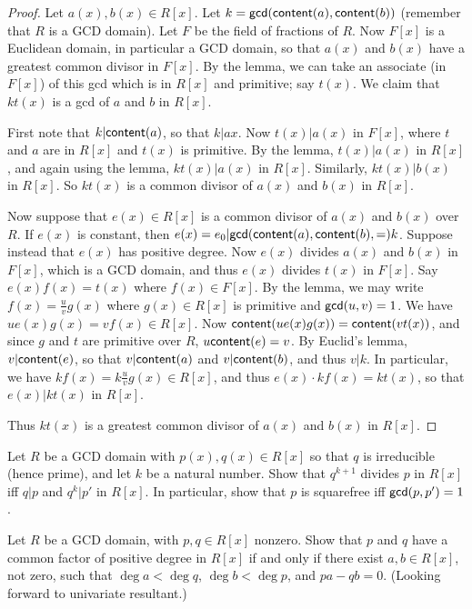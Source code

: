 \begin{proof}
Let \(a(x), b(x) \in R[x]\). Let \(k = \mathsf{gcd}(\mathsf{content}(a), \mathsf{content}(b))\) (remember that \(R\) is a GCD domain). Let \(F\) be the field of fractions of \(R\). Now \(F[x]\) is a Euclidean domain, in particular a GCD domain, so that \(a(x)\) and \(b(x)\) have a greatest common divisor in \(F[x]\). By the lemma, we can take an associate (in \(F[x]\)) of this gcd which is in \(R[x]\) and primitive; say \(t(x)\). We claim that \(kt(x)\) is a gcd of \(a\) and \(b\) in \(R[x]\).

First note that \(k|\mathsf{content}(a)\), so that \(k|a{x}\). Now \(t(x)|a(x)\) in \(F[x]\), where \(t\) and \(a\) are in \(R[x]\) and \(t(x)\) is primitive. By the lemma, \(t(x)|a(x)\) in \(R[x]\), and again using the lemma, \(kt(x)|a(x)\) in \(R[x]\). Similarly, \(kt(x)|b(x)\) in \(R[x]\). So \(kt(x)\) is a common divisor of \(a(x)\) and \(b(x)\) in \(R[x]\).

Now suppose that \(e(x) \in R[x]\) is a common divisor of \(a(x)\) and \(b(x)\) over \(R\). If \(e(x)\) is constant, then \(e(x) = e_0 | \mathsf{gcd}(\mathsf{content}(a), \mathsf{content}(b), =) k\). Suppose instead that \(e(x)\) has positive degree. Now \(e(x)\) divides \(a(x)\) and \(b(x)\) in \(F[x]\), which is a GCD domain, and thus \(e(x)\) divides \(t(x)\) in \(F[x]\). Say \(e(x)f(x) = t(x)\) where \(f(x) \in F[x]\). By the lemma, we may write \(f(x) = \frac{u}{v}g(x)\) where \(g(x) \in R[x]\) is primitive and \(\mathsf{gcd}(u, v) = 1\). We have \(ue(x)g(x) = vf(x) \in R[x]\). Now \(\mathsf{content}(ue(x)g(x)) = \mathsf{content}(vt(x))\), and since \(g\) and \(t\) are primitive over \(R\), \(u\mathsf{content}(e) = v\). By Euclid's lemma, \(v|\mathsf{content}(e)\), so that \(v|\mathsf{content}(a)\) and \(v|\mathsf{content}(b)\), and thus \(v|k\). In particular, we have \(kf(x) = k\frac{u}{v}g(x) \in R[x]\), and thus \(e(x) \cdot kf(x) = kt(x)\), so that \(e(x)|kt(x)\) in \(R[x]\).

Thus \(kt(x)\) is a greatest common divisor of \(a(x)\) and \(b(x)\) in \(R[x]\).
\end{proof}



\Exercises%

\begin{exercise}
Let \(R\) be a GCD domain with \(p(x), q(x) \in R[x]\) so that \(q\) is irreducible (hence prime), and let \(k\) be a natural number. Show that \(q^{k+1}\) divides \(p\) in \(R[x]\) iff \(q|p\) and \(q^k|p'\) in \(R[x]\). In particular, show that \(p\) is squarefree iff \(\mathsf{gcd}(p, p') = 1\).
\end{exercise}

\begin{exercise}
Let \(R\) be a GCD domain, with \(p,q \in R[x]\) nonzero. Show that \(p\) and \(q\) have a common factor of positive degree in \(R[x]\) if and only if there exist \(a,b \in R[x]\), not zero, such that \(\deg{a} < \deg{q}\), \(\deg{b} < \deg{p}\), and \(pa - qb = 0\). (Looking forward to univariate resultant.)
\end{exercise}
